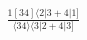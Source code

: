 \documentclass[varwidth, border=5pt]{standalone}
\begin{document}
\begin{my}
$\begin{gathered}
\scriptscriptstyle\frac{1[34]⟨2|3+4|1]}{⟨34⟩⟨3|2+4|3]}
\end{gathered}$
\end{my}
\end{document}
